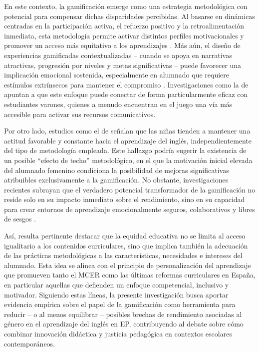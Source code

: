 \documentclass[spanish]{textolivre}
\begin{document}
En este contexto, la gamificación emerge como una estrategia metodológica con potencial para compensar dichas disparidades percibidas. Al basarse en dinámicas centradas en la participación activa, el refuerzo positivo y la retroalimentación inmediata, esta metodología permite activar distintos perfiles motivacionales y promover un acceso más equitativo a los aprendizajes \cite{zahedi2021}. Más aún, el diseño de experiencias gamificadas contextualizadas – cuando se apoya en narrativas atractivas, progresión por niveles y metas significativas – puede favorecer una implicación emocional sostenida, especialmente en alumnado que requiere estímulos extrínsecos para mantener el compromiso \cite{garciamoreno2019}. Investigaciones como la de \textcite{liu2024} apuntan a que este enfoque puede conectar de forma particularmente eficaz con estudiantes varones, quienes a menudo encuentran en el juego una vía más accesible para activar sus recursos comunicativos.

Por otro lado, estudios como el de \textcite{fernandezbarrionuevo2022} señalan que las niñas tienden a mantener una actitud favorable y constante hacia el aprendizaje del inglés, independientemente del tipo de metodología empleada. Este hallazgo podría sugerir la existencia de un posible ``efecto de techo'' metodológico, en el que la motivación inicial elevada del alumnado femenino condiciona la posibilidad de mejoras significativas atribuibles exclusivamente a la gamificación. No obstante, investigaciones recientes subrayan que el verdadero potencial transformador de la gamificación no reside solo en su impacto inmediato sobre el rendimiento, sino en su capacidad para crear entornos de aprendizaje emocionalmente seguros, colaborativos y libres de sesgos \cite{mellado2024}.

Así, resulta pertinente destacar que la equidad educativa no se limita al acceso igualitario a los contenidos curriculares, sino que implica también la adecuación de las prácticas metodológicas a las características, necesidades e intereses del alumnado. Esta idea se alinea con el principio de personalización del aprendizaje que promueven tanto el MCER como las últimas reformas curriculares en España, en particular aquellas que defienden un enfoque competencial, inclusivo y motivador. Siguiendo estas líneas, la presente investigación busca aportar evidencia empírica sobre el papel de la gamificación como herramienta para reducir – o al menos equilibrar – posibles brechas de rendimiento asociadas al género en el aprendizaje del inglés en EP, contribuyendo al debate sobre cómo combinar innovación didáctica y justicia pedagógica en contextos escolares contemporáneos.
\end{document}
